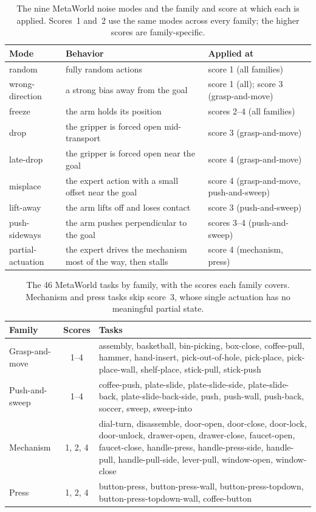 \begin{table}[t]
\centering\footnotesize
\caption[MetaWorld noise modes]{The nine MetaWorld noise modes and the family and score at which each is applied. Scores~1 and~2 use the same modes across every family; the higher scores are family-specific.}
\label{tab:sim-modes}
\begin{tabular}{@{}p{2.4cm}p{5.9cm}p{4.7cm}@{}}
\toprule
Mode & Behavior & Applied at \\
\midrule
random & fully random actions & score 1 (all families) \\
wrong-direction & a strong bias away from the goal & score 1 (all); score 3 (grasp-and-move) \\
freeze & the arm holds its position & scores 2--4 (all families) \\
drop & the gripper is forced open mid-transport & score 3 (grasp-and-move) \\
late-drop & the gripper is forced open near the goal & score 4 (grasp-and-move) \\
misplace & the expert action with a small offset near the goal & score 4 (grasp-and-move, push-and-sweep) \\
lift-away & the arm lifts off and loses contact & score 3 (push-and-sweep) \\
push-sideways & the arm pushes perpendicular to the goal & scores 3--4 (push-and-sweep) \\
partial-actuation & the expert drives the mechanism most of the way, then stalls & score 4 (mechanism, press) \\
\bottomrule
\end{tabular}
\end{table}

\begin{table}[t]
\centering\footnotesize
\caption[MetaWorld tasks by family]{The 46 MetaWorld tasks by family, with the scores each family covers. Mechanism and press tasks skip score~3, whose single actuation has no meaningful partial state.}
\label{tab:sim-tasks}
\begin{tabular}{@{}p{2.3cm}cp{9.0cm}@{}}
\toprule
Family & Scores & Tasks \\
\midrule
Grasp-and-move & 1--4 & assembly, basketball, bin-picking, box-close, coffee-pull, hammer, hand-insert, pick-out-of-hole, pick-place, pick-place-wall, shelf-place, stick-pull, stick-push \\
\addlinespace
Push-and-sweep & 1--4 & coffee-push, plate-slide, plate-slide-side, plate-slide-back, plate-slide-back-side, push, push-wall, push-back, soccer, sweep, sweep-into \\
\addlinespace
Mechanism & 1, 2, 4 & dial-turn, disassemble, door-open, door-close, door-lock, door-unlock, drawer-open, drawer-close, faucet-open, faucet-close, handle-press, handle-press-side, handle-pull, handle-pull-side, lever-pull, window-open, window-close \\
\addlinespace
Press & 1, 2, 4 & button-press, button-press-wall, button-press-topdown, button-press-topdown-wall, coffee-button \\
\bottomrule
\end{tabular}
\end{table}

